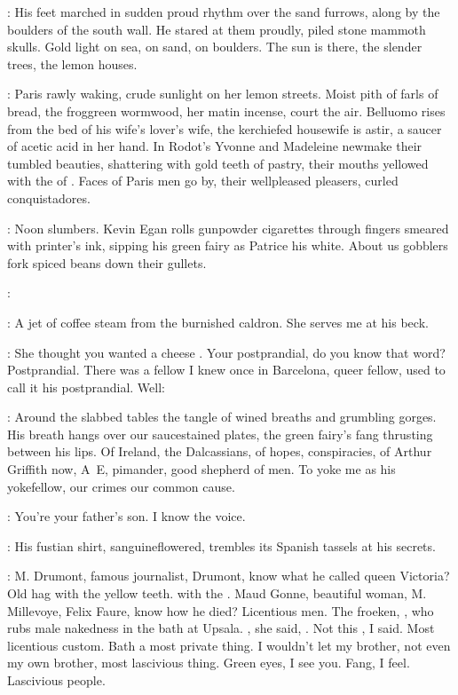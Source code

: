 :
His feet marched in sudden proud rhythm over the sand furrows,
along by the boulders of the south wall.
He stared at them proudly,
piled stone mammoth skulls.
Gold light on sea, on sand, on boulders.
The sun is there, the slender trees, the lemon houses.

:
Paris rawly waking, crude sunlight on her lemon streets.
Moist pith of farls of bread,
the froggreen wormwood,
her matin incense,
court the air.
Belluomo rises from the bed of his wife's lover's wife,
the kerchiefed housewife is astir,
a saucer of acetic acid in her hand.
In Rodot's
Yvonne and Madeleine newmake their tumbled beauties,
shattering with gold teeth  of pastry,
their mouths yellowed with the  of .
Faces of Paris men go by, their wellpleased pleasers,
curled conquistadores.

\StephenInt:
Noon slumbers.
Kevin Egan rolls gunpowder cigarettes
through fingers smeared with printer's ink,
sipping his green fairy
as Patrice his white.
About us gobblers fork spiced beans down their gullets.

\kevin:

\StephenInt:
A jet of coffee steam from the burnished caldron.
She serves me at his beck.

\kevin:
She thought you wanted a cheese .
Your postprandial, do you know that word?
Postprandial.
There was a fellow I knew once in Barcelona, queer fellow,
used to call it his postprandial.
Well:

\StephenInt:
Around the slabbed tables
the tangle of wined breaths and grumbling gorges.
His breath hangs over our saucestained plates,
the green fairy's fang thrusting between his lips.
Of Ireland, the Dalcassians,
of hopes, conspiracies,
of Arthur Griffith now,
A~E,
pimander, good shepherd of men.
To yoke me as his yokefellow,
our crimes our common cause.

\kevin:
You're your father's son.
I know the voice.

\StephenInt:
His fustian shirt, sanguineflowered,
trembles its Spanish tassels at his secrets.

\kevin:
M. Drumont, famous journalist, Drumont,
know what he called queen Victoria?
Old hag with the yellow teeth.
 with the .
Maud Gonne, beautiful woman,
M. Millevoye,
Felix Faure, know how he died?
Licentious men.
The froeken, ,
who rubs male nakedness in the bath at Upsala.
, she said, .
Not this , I said.
Most licentious custom.
Bath a most private thing.
I wouldn't let my brother, not even my own brother,
most lascivious thing.
Green eyes, I see you.
Fang, I feel.
Lascivious people.

